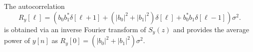 The autocorrelation
\begin{equation}
R_y[\ell] = \left( b_0 b_1^* \delta[\ell+1] + (|b_0|^2 + |b_1|^2)\delta[\ell] + b_0^* b_1 \delta[\ell-1] \right) \sigma^2.
\label{eq:ma1ExampleXcorr}
\end{equation}
is obtained via an inverse Fourier transform of $S_y(z)$ and provides the average power of $y[n]$ as $R_y[0]=(|b_0|^2 + |b_1|^2) \sigma^2$.
\eExample








